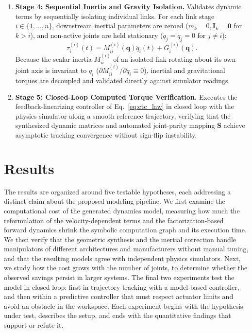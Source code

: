 \documentclass[fleqn,10pt]{article}
\begin{document}
\begin{enumerate}
	\item \textbf{Stage 4: Sequential Inertia and Gravity Isolation.} Validates dynamic terms by sequentially isolating individual links. For each link stage $i \in \{1, \dots, n\}$, downstream inertial parameters are zeroed ($m_k = 0, \bm{I}_k = \bm{0}$ for $k > i$), and non-active joints are held stationary ($\dot{q}_j = \ddot{q}_j = 0$ for $j \neq i$):
	\begin{equation}
		\tau_i^{(i)}(t) = M_{ii}^{(i)}(\bm{q})\ddot{q}_i(t) + G_i^{(i)}(\bm{q}).
		\label{eq:isolated_link_torque}
	\end{equation}
	Because the scalar inertia $M_{ii}^{(i)}$ of an isolated link rotating about its own joint axis is invariant to $q_i$ ($\partial M_{ii}^{(i)}/\partial q_i \equiv 0$), inertial and gravitational torques are decoupled and validated directly against simulator readings.	
	\item \textbf{Stage 5: Closed-Loop Computed Torque Verification.} Executes the feedback-linearizing controller of Eq.~\eqref{eq:ctc_law} in closed loop with the physics simulator along a smooth reference trajectory, verifying that the synthesized dynamic matrices and automated joint-parity mapping $\bm{S}$ achieve asymptotic tracking convergence without sign-flip instability.
\end{enumerate}
	
\section{Results} \label{sec:results}

The results are organized around five testable hypotheses, each addressing a distinct claim about the proposed modeling pipeline. We first examine the computational cost of the generated dynamics model, measuring how much the reformulation of the velocity-dependent terms and the factorization-based forward dynamics shrink the symbolic computation graph and its execution time. We then verify that the geometric synthesis and the inertial correction handle manipulators of different architectures and manufacturers without manual tuning, and that the resulting models agree with independent physics simulators. Next, we study how the cost grows with the number of joints, to determine whether the observed savings persist in larger systems. The final two experiments test the model in closed loop: first in trajectory tracking with a model-based controller, and then within a predictive controller that must respect actuator limits and avoid an obstacle in the workspace. Each experiment begins with the hypothesis under test, describes the setup, and ends with the quantitative findings that support or refute it.
\end{document}
